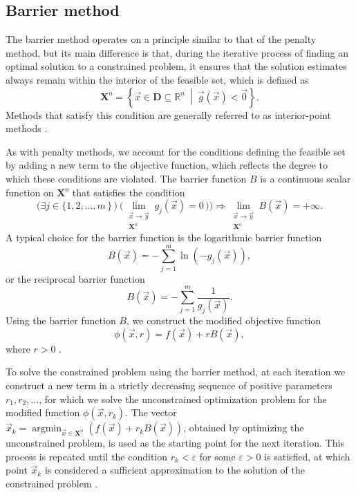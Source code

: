 \subsection{Barrier method}\label{barrier method}
The barrier method operates on a principle similar to that of the penalty method, but its main difference is that, during the iterative process of finding an optimal solution to a constrained problem, it ensures that the solution estimates always remain within the interior of the feasible set, which is defined as
\begin{equation}
	\mathbf{X}^{\mathrm{o}} = \left\{ \vec{x} \in \mathbf{D} \subseteq \mathbb{R}^n \ \middle| \ \vec{g}(\vec{x}) < \vec{0} \right\}.
\end{equation}
Methods that satisfy this condition are generally referred to as interior-point methods \cite{non-linear-textbook}.

As with penalty methods, we account for the conditions defining the feasible set by adding a new term to the objective function, which reflects the degree to which these conditions are violated. The barrier function $ B $ is a continuous scalar function on $ \mathbf{X}^{\mathrm{o}} $ that satisfies the condition
\begin{equation}
	\Big( \exists j \in \{1,2,\dots,m \, \} \,\big) \ \big(\lim\limits_{\substack{\vec{x} \to \vec{y} \\ \mathbf{X}^{\mathrm{o}}}} g_j (\vec{x}) = 0 \, \big) \Big) \Rightarrow \lim\limits_{\substack{\vec{x} \to \vec{y} \\ \mathbf{X}^{\mathrm{o}}}} B (\vec{x}) = + \infty.
\end{equation}
A typical choice for the barrier function is the logarithmic barrier function
\begin{equation}\label{eq:log barrier function}
	B (\vec{x}) = -\sum_{j=1}^{m} \ln \left( - g_j (\vec{x}) \right),
\end{equation}
or the reciprocal barrier function
\begin{equation}\label{eq:reciprocal barrier function}
	B (\vec{x}) = -\sum_{j=1}^{m} \frac{1}{g_j (\vec{x})}.
\end{equation}
Using the barrier function $ B $, we construct the modified objective function
\begin{equation}\label{eq:cost function with barrier}
	\phi (\vec{x}, r) = f (\vec{x}) + r B(\vec{x}),
\end{equation}
where $ r > 0 $ \cite{non-linear-textbook}.

To solve the constrained problem using the barrier method, at each iteration we construct a new term in a strictly decreasing sequence of positive parameters $ r_1, r_2, \dots$, for which we solve the unconstrained optimization problem for the modified function $ \phi (\vec{x}, r_k)$. The vector $ \vec{x}_k  = \operatorname*{argmin}_{\vec{x} \in \mathbf{X}^\mathrm{o}} (f(\vec{x}) + r_k B(\vec{x})) $, obtained by optimizing the unconstrained problem, is used as the starting point for the next iteration. This process is repeated until the condition $ r_k < \varepsilon$ for some $ \varepsilon > 0$ is satisfied, at which point $ \vec{x}_k $ is considered a sufficient approximation to the solution of the constrained problem \cite{non-linear-textbook}.

